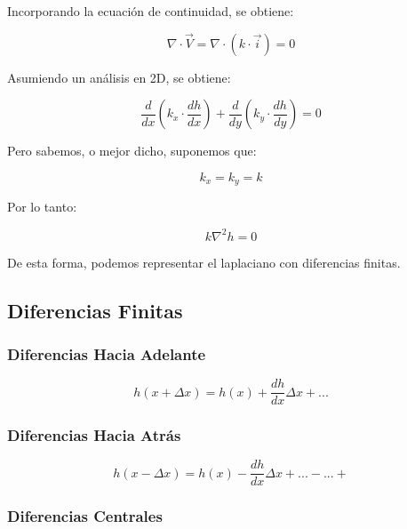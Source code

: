 Incorporando la ecuación de continuidad, se obtiene:

\begin{equation}
    \nabla \cdot \vec{V} = \nabla \cdot (k \cdot \vec{i}) = 0
\end{equation}

Asumiendo un análisis en 2D, se obtiene:

\begin{equation}
    \frac{d}{dx}(k_x \cdot \frac{dh}{dx}) + \frac{d}{dy}(k_y \cdot \frac{dh}{dy}) = 0
\end{equation}

Pero sabemos, o mejor dicho, suponemos que:

\begin{equation}
    k_x = k_y = k
\end{equation}

Por lo tanto:

\begin{equation}
    k \nabla^2 h = 0
\end{equation}

De esta forma, podemos representar el laplaciano con diferencias finitas.

\subsection{Diferencias Finitas}

\subsubsection{Diferencias Hacia Adelante}

\begin{equation}
    h(x + \Delta x) = h(x) + \frac{dh}{dx} \Delta x + ...
\end{equation}

\subsubsection{Diferencias Hacia Atrás}

\begin{equation}
    h(x - \Delta x) = h(x) - \frac{dh}{dx} \Delta x + ...-...+
\end{equation}

\subsubsection{Diferencias Centrales}

